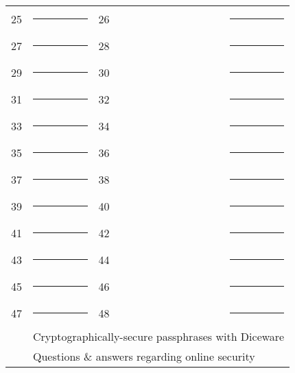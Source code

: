 \begin{center}
	
\begin{tabular}{l l l l }
	25 & \rule{1.75in}{.2pt} & 26 & \rule{1.75in}{.2pt} \vspace{.225in} \\
	27 & \rule{1.75in}{.2pt} & 28 & \rule{1.75in}{.2pt} \vspace{.225in} \\
	29 & \rule{1.75in}{.2pt} & 30 & \rule{1.75in}{.2pt} \vspace{.225in} \\
	31 & \rule{1.75in}{.2pt} & 32 & \rule{1.75in}{.2pt} \vspace{.225in} \\
	33 & \rule{1.75in}{.2pt} & 34 & \rule{1.75in}{.2pt} \vspace{.225in} \\
	35 & \rule{1.75in}{.2pt} & 36 & \rule{1.75in}{.2pt} \vspace{.225in} \\
	37 & \rule{1.75in}{.2pt} & 38 & \rule{1.75in}{.2pt} \vspace{.225in} \\
	39 & \rule{1.75in}{.2pt} & 40 & \rule{1.75in}{.2pt} \vspace{.225in} \\
	41 & \rule{1.75in}{.2pt} & 42 & \rule{1.75in}{.2pt} \vspace{.225in} \\
	43 & \rule{1.75in}{.2pt} & 44 & \rule{1.75in}{.2pt} \vspace{.225in} \\
	45 & \rule{1.75in}{.2pt} & 46 & \rule{1.75in}{.2pt} \vspace{.225in} \\
	47 & \rule{1.75in}{.2pt} & 48 & \rule{1.75in}{.2pt} \vspace{.275in} \\
	\pageref{ch:diceware} & \multicolumn{3}{l}{Cryptographically-secure passphrases with Diceware} \vspace{.275in} \\
	\pageref{ch:qna} & \multicolumn{3}{l}{Questions \& answers regarding online security} \\
\end{tabular}
	
\end{center}
